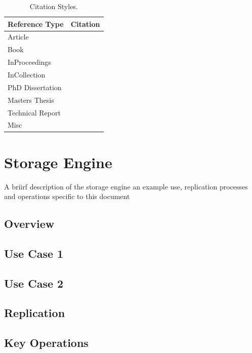 \documentclass[11pt,a4paper,oneside]{book} %
\numberwithin{equation}{section}
\begin{document}
\begin{table}[!th]
\centering


\begin{tabular}{|p{3cm}|p{9cm}|}
\hline
\textbf{Reference Type} & \textbf{Citation}\\ \hline
Article & \cite{Hayes1993}\\ \hline
Book & \cite[p.127-133]{Lamport2005}\\ \hline
InProceedings & \cite*{Nicholls1987}\\ \hline
InCollection & \cite{Lund2019}\\ \hline
PhD Dissertation & \cite{Konnov2019}\\ \hline
Masters Thesis & \cite{Lamport2005}\\ \hline
Technical Report & \cite{Engberg1993}\\ \hline
Misc & \cite{Hayes1993}\\ \hline
\end{tabular}
\caption{Citation Styles.}
\label{t-References}
\end{table}


\chapter{Storage Engine}
A briirf description of the storage engine an example use, replication processes and operations specific to this document

\section{Overview}

\section{Use Case 1}

\section{Use Case 2}

\section{Replication}

\section{Key Operations}
\end{document}
